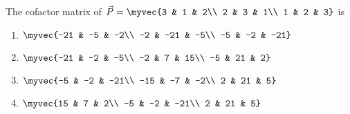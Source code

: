 \item The cofactor matrix of 
$\vec{P}=\myvec{3 & 1 & 2\\ 2 & 3 & 1\\ 1 & 2 & 3}$ is
\hfill{}
\begin{multicols}{2}
\begin{enumerate}
  \item $\myvec{-21 & -5 & -2\\ -2 & -21 & -5\\ -5 & -2 & -21}$
  \item $\myvec{-21 & -2 & -5\\ -2 & 7 & 15\\ -5 & 21 & 2}$
  \item $\myvec{-5 & -2 & -21\\ -15 & -7 & -2\\ 2 & 21 & 5}$
  \item $\myvec{15 & 7 & 2\\ -5 & -2 & -21\\ 2 & 21 & 5}$
\end{enumerate}
\end{multicols}

